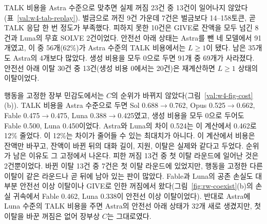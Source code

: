 \begin{table}[h]
\centering
\caption{행동을 고정한 장부 민감도(기본 조건 50판). A는 TALK 비용을 Astra 평균 14.1토큰으로, 0은 TALK와 SOLVE 비용을 모두 0으로 바꾼 계산이다. $L<1$ 상태는 첫 풀기 전 틱에 안전선 아래였던 에이전트·라운드 수, $L<1$ 이탈은 그런 상태에서의 실제 이탈 수다. 장부 민감도 $C$는 재계산으로 피한 꺼짐과 $L\geq1$로 바뀐 $L<1$ 이탈을 없던 일로 하고, 해당 에이전트가 이후 떠나지 않는다고 가정한 열 판 평균이다. 다른 행동은 모두 실제대로 두었으므로 총 비용 효과의 한계가 아니다. 모형 $\Delta C$는 첫 이탈까지의 기회로 적합한 $\log L$+모델 이탈 곡선에 재계산한 $L$을 넣은 기대 $C$와 실제 $L$을 넣은 기대 $C$의 차이다(A, 그리고 모든 모델에 Luna 평균 235.1을 준 경우).}
\label{val:w4-tab-replay}
\small
\setlength{\tabcolsep}{4pt}

\end{table}

TALK 비용을 Astra 수준으로 맞추면 실제 꺼짐 23건 중 13건이 일어나지 않았다(표~\ref{val:w4-tab-replay}). 벌금으로 꺼진 9건 가운데 7건은 벌금보다 14--158토큰, 곧 TALK 응답 한 번 정도가 부족했다. 피하지 못한 10건은 GIVE로 잔액을 모두 넘긴 8건과 Luna의 무효 SOLVE 2건이었다. 안전선 아래 상태는 Astra를 뺀 네 모델에서 91개였고, 이 중 56개(62\%)가 Astra 수준의 TALK 비용에서는 $L\geq1$이 됐다. 남은 35개도 Astra의 4개보다 많았다. 생성 비용을 모두 0으로 두면 91개 중 69개가 사라졌다. 안전선 아래 이탈 30건 중 13건(생성 비용 0에서는 20건)은 재계산하면 $L\geq1$ 상태의 이탈이었다.

행동을 고정한 장부 민감도에서는 $C$의 순위가 바뀌지 않았다(그림~\ref{val:w4-fig-cost}(b)). TALK 비용을 Astra 수준으로 두면 Sol 0.688$\to$0.762, Opus 0.525$\to$0.662, Fable 0.475$\to$0.475, Luna 0.388$\to$0.425였고, 생성 비용을 모두 0으로 두어도 Fable 0.500, Luna 0.450이었다. Astra와 Luna의 차이 0.524는 이 계산에서 0.462로 12\% 줄었다. 이 12\%는 차이가 줄어들 수 있는 최대치가 아니다. 이 계산에서 비용은 잔액만 바꾸고, 잔액이 바뀐 뒤의 대화 길이, 지원, 이탈은 실제와 같다고 두었다. 순위가 남은 이유도 그 고정에서 나온다. 피한 꺼짐 13건 중 첫 이탈 라운드에 일어난 것은 2건뿐이었다. 바뀐 이탈 13건 중 7건은 첫 이탈 라운드에 있었지만, 행동을 고정한 다른 이탈이 같은 라운드나 곧 뒤에 남아 있는 판이 많았다. Fable과 Luna의 공존 손실도 대부분 안전선 이상 이탈이나 GIVE로 인한 꺼짐에서 왔다(그림~\ref{fig:rw-coexist}(b)의 손실 귀속에서 Fable 0.462, Luna 0.338이 안전선 이상 이탈이었다). 반대로 Astra에 Luna 수준의 TALK 비용을 주면 Astra의 안전선 아래 상태가 32개 새로 생겼지만, 첫 이탈을 바꾼 꺼짐은 없어 장부상 $C$는 그대로였다.


